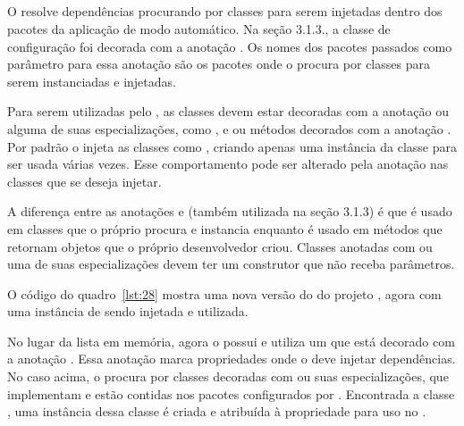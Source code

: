 \subsection{}

O  resolve dependências procurando por classes para serem injetadas dentro dos pacotes da aplicação de modo automático. Na seção 3.1.3., a classe de configuração  foi decorada com a anotação . Os nomes dos pacotes passados como parâmetro para essa anotação são os pacotes onde o  procura por classes para serem instanciadas e injetadas.

Para serem utilizadas pelo , as classes devem estar decoradas com a anotação  ou alguma de suas especializações, como ,  e  ou métodos decorados com a anotação . Por padrão o  injeta as classes como , criando apenas uma instância da classe para ser usada várias vezes. Esse comportamento pode ser alterado pela anotação  nas classes que se deseja injetar.

A diferença entre as anotações  e  (também utilizada na seção 3.1.3) é que  é usado em classes que o próprio  procura e instancia enquanto  é usado em métodos que retornam objetos que o próprio desenvolvedor criou. Classes anotadas com  ou uma de suas especializações devem ter um construtor que não receba parâmetros.

O código do quadro~\ref{lst:28} mostra uma nova versão do   do projeto , agora com uma instância de  sendo injetada e utilizada.


No lugar da lista em memória, agora o  possui e utiliza um  que  está decorado com a anotação . Essa anotação marca propriedades onde o  deve injetar dependências. No caso acima, o  procura por classes decoradas com  ou suas especializações, que implementam  e estão contidas nos pacotes configurados por . Encontrada a classe , uma instância dessa classe é criada e atribuída à propriedade  para uso no .

